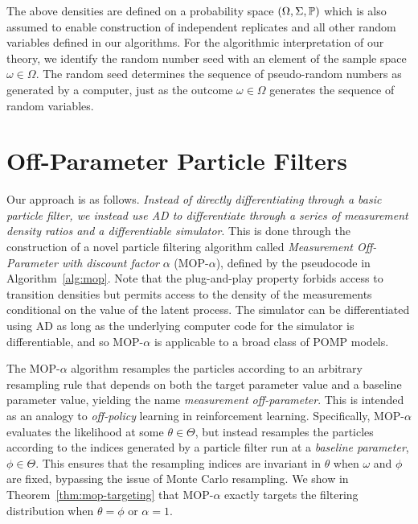 \documentclass[9pt,twocolumn,pnasresearcharticle]{pnas-new}
\begin{document}
The above densities are defined on a probability space $(\Omega, \Sigma, \mathbb{P})$ which is also assumed to enable construction of independent replicates and all other random variables defined in our algorithms.
For the algorithmic interpretation of our theory, we identify the random number seed with an element of the sample space $\omega \in \Omega$. The random seed determines the sequence of pseudo-random numbers as generated by a computer, just as the outcome $\omega\in\Omega$ generates the sequence of random variables.



\section{Off-Parameter Particle Filters}

Our approach is as follows. \textit{Instead of directly differentiating through a basic particle filter, we instead use AD to differentiate through a series of measurement density ratios and a differentiable simulator}. 
This is done through the construction of a novel particle filtering algorithm called {\it Measurement Off-Parameter with discount factor} $\alpha$ (MOP-$\alpha$), defined by the pseudocode in Algorithm~\ref{alg:mop}.
Note that the plug-and-play property forbids access to transition densities but permits access to the density of the measurements conditional on the value of the latent process.
The simulator can be differentiated using AD as long as the underlying computer code for the simulator is differentiable, and so MOP-$\alpha$ is applicable to a broad class of POMP models.

The MOP-$\alpha$ algorithm resamples the particles according to an arbitrary resampling rule that depends on both the target parameter value and a baseline parameter value, yielding the name {\it measurement off-parameter}.
This is intended as an analogy to {\it off-policy} learning in reinforcement learning.
Specifically, MOP-$\alpha$ evaluates the likelihood at some $\theta \in \Theta$, but instead resamples the particles according to the indices generated by a particle filter run at a {\it baseline parameter}, $\phi \in \Theta$.
This ensures that the resampling indices are invariant in $\theta$ when $\omega$ and $\phi$ are fixed, bypassing the issue of Monte Carlo resampling.
We show in Theorem~\ref{thm:mop-targeting} that MOP-$\alpha$ exactly targets the filtering distribution when $\theta=\phi$ or $\alpha=1$.
\end{document}
